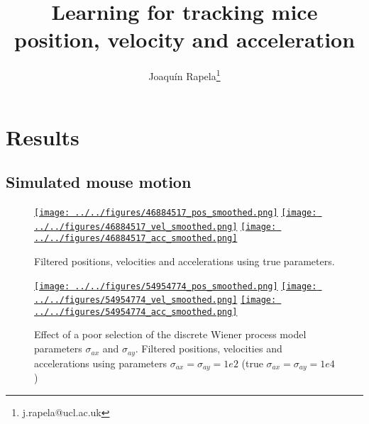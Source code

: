 \documentclass[12pt]{article}
\title{Learning for tracking mice position, velocity and acceleration}
\author{Joaqu\'{i}n Rapela\thanks{j.rapela@ucl.ac.uk}}
\begin{document}
\maketitle

\section{Results}

\subsection{Simulated mouse motion}

\begin{figure}
    \begin{center}

        \href{http://www.gatsby.ucl.ac.uk/~rapela/fwg/reports/learning/figures/46884517_pos_smoothed.html}{\texttt{[image: ../../figures/46884517\_pos\_smoothed.png]}}
        \href{http://www.gatsby.ucl.ac.uk/~rapela/fwg/reports/learning/figures/46884517_vel_smoothed.html}{\texttt{[image: ../../figures/46884517\_vel\_smoothed.png]}}
        \href{http://www.gatsby.ucl.ac.uk/~rapela/fwg/reports/learning/figures/46884517_acc_smoothed.html}{\texttt{[image: ../../figures/46884517\_acc\_smoothed.png]}}

        \caption{Filtered positions, velocities and accelerations using true parameters.}

        \label{fig:simulations_trueParams}

    \end{center}
\end{figure}

\begin{figure}
    \begin{center}

        \href{http://www.gatsby.ucl.ac.uk/~rapela/fwg/reports/learning/figures/54954774_pos_smoothed.html}{\texttt{[image: ../../figures/54954774\_pos\_smoothed.png]}}
        \href{http://www.gatsby.ucl.ac.uk/~rapela/fwg/reports/learning/figures/54954774_vel_smoothed.html}{\texttt{[image: ../../figures/54954774\_vel\_smoothed.png]}}
        \href{http://www.gatsby.ucl.ac.uk/~rapela/fwg/reports/learning/figures/54954774_acc_smoothed.html}{\texttt{[image: ../../figures/54954774\_acc\_smoothed.png]}}

        \caption{Effect of a poor selection of the discrete Wiener process
        model parameters $\sigma_{ax}$ and $\sigma_{ay}$. Filtered positions,
        velocities and accelerations using parameters
        $\sigma_{ax}=\sigma_{ay}=1e2$ (true $\sigma_{ax}=\sigma_{ay}=1e4$)}

        \label{fig:simulations_poorSelectionOfSigma_a}

    \end{center}
\end{figure}
\end{document}
